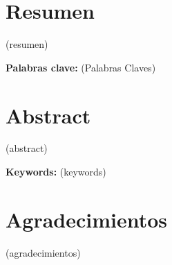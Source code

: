 \documentclass[11pt,a4paper]{report}
\begin{document}
    \chapter*{Resumen}
    
    (resumen)
    
    \vfill
    \noindent\textbf{Palabras clave:} (Palabras Claves)
    
    \newpage

    \chapter*{Abstract}
    
    (abstract)
    
    \vfill
    \noindent\textbf{Keywords:} (keywords)
    
    \newpage
    
    \chapter*{Agradecimientos}
    (agradecimientos)
    
    \newpage
    
    \tableofcontents
    \listoffigures
    \listoftables
    \newpage
    
    
    
    
     
    
    
        
    
    \nocite{*}
    

    \appendix
    \gdef\chapterautorefname{Apéndice}
    
    
    
    
    
\end{document}
